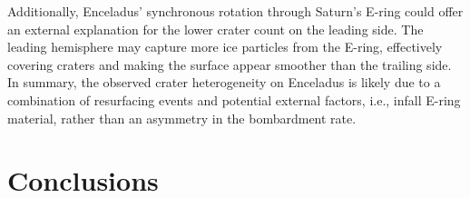 \documentclass[preprint,12pt,3p,times,authoryear]{elsarticle}
\begin{document}
Additionally, Enceladus' synchronous rotation through Saturn's E-ring could offer an external explanation for the lower crater count on the leading side. The leading hemisphere may capture more ice particles from the E-ring, effectively covering craters and making the surface appear smoother than the trailing side.\\

In summary, the observed crater heterogeneity on Enceladus is likely due to a combination of resurfacing events and potential external factors, i.e., infall E-ring material, rather than an asymmetry in the bombardment rate.

\section{Conclusions}


{}
\end{document}
